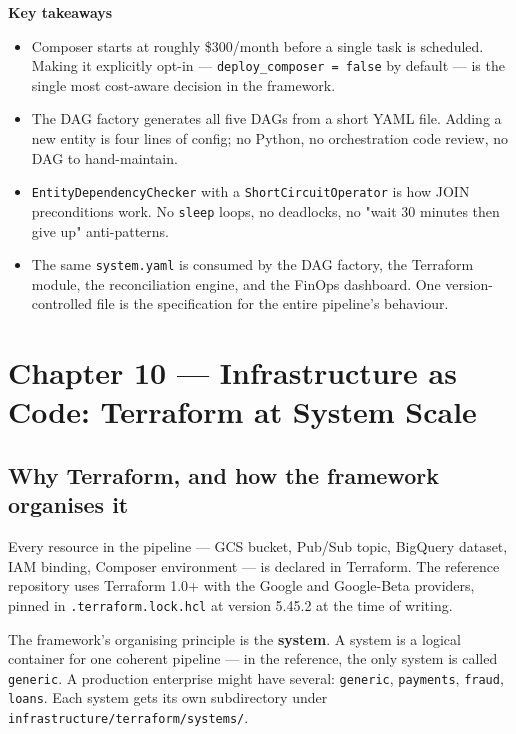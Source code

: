 \documentclass[
  11pt,
  british,
  oneside]{book}
\begin{document}
\begin{takeaways}
\textbf{Key takeaways}
\begin{itemize}
  \item Composer starts at roughly \$300/month before a single task is scheduled. Making it explicitly opt-in — \texttt{deploy\_composer = false} by default — is the single most cost-aware decision in the framework.
  \item The DAG factory generates all five DAGs from a short YAML file. Adding a new entity is four lines of config; no Python, no orchestration code review, no DAG to hand-maintain.
  \item \texttt{EntityDependencyChecker} with a \texttt{ShortCircuitOperator} is how JOIN preconditions work. No \texttt{sleep} loops, no deadlocks, no "wait 30 minutes then give up" anti-patterns.
  \item The same \texttt{system.yaml} is consumed by the DAG factory, the Terraform module, the reconciliation engine, and the FinOps dashboard. One version-controlled file is the specification for the entire pipeline's behaviour.
\end{itemize}
\end{takeaways}

\newpage

\hypertarget{chapter-10-infrastructure-as-code-terraform-at-system-scale}{%
\chapter{Chapter 10 --- Infrastructure as Code: Terraform at System
Scale}\label{chapter-10-infrastructure-as-code-terraform-at-system-scale}}

\hypertarget{why-terraform-and-how-the-framework-organises-it}{%
\section{Why Terraform, and how the framework organises
it}\label{why-terraform-and-how-the-framework-organises-it}}

Every resource in the pipeline --- GCS bucket, Pub/Sub topic, BigQuery
dataset, IAM binding, Composer environment --- is declared in
Terraform. The reference repository uses Terraform 1.0+
with the Google and Google-Beta providers, pinned in
\texttt{.terraform.lock.hcl} at version 5.45.2 at the time of writing.

The framework's organising principle is the \textbf{system}. A system is
a logical container for one coherent pipeline --- in the reference, the
only system is called \texttt{generic}. A production enterprise might
have several: \texttt{generic}, \texttt{payments}, \texttt{fraud},
\texttt{loans}. Each system gets its own subdirectory under
\texttt{infrastructure/terraform/systems/}.
\end{document}
